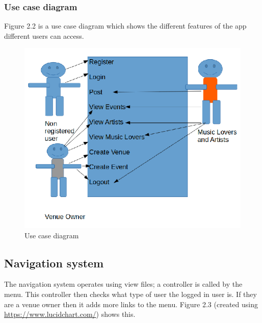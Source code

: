 \subsubsection{Use case diagram}
Figure 2.2 is a use case diagram which shows the different features of the app different users can access.
\begin{center} 
\begin{figure}[H]
\begin{center}
\includegraphics[scale=0.45]{images/usecase}
\end{center}
\caption{Use case diagram}
\end{figure}
\end{center}

\subsection{Navigation system}
The navigation system operates using view files; a controller is called by the menu. This controller then checks what type of user the logged in user is. If they are a venue owner then it adds more links to the menu. Figure 2.3 (created using \url{https://www.lucidchart.com/}) shows this.

